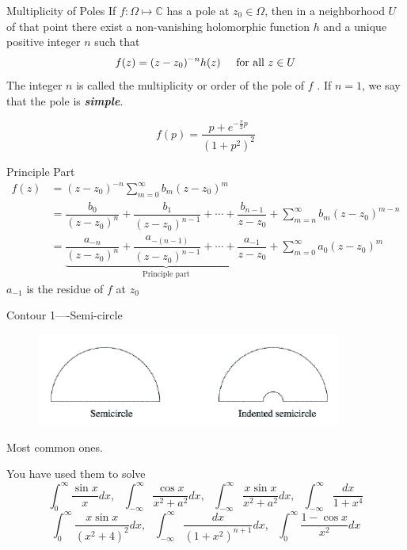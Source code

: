 \documentclass{beamer}
\begin{document}
\begin{frame}
\begin{block}{Multiplicity of Poles}
If $f : \Omega\mapsto\mathbb{C}$ has a pole at $z_0\in\Omega$, then in a neighborhood $U$ of that point there exist a non-vanishing holomorphic function $h$ and a unique positive integer $n$ such that
$$f(z)=(z-z_0)^{-n}h(z)\hspace{5mm}\text{for all}\,\, z\in U$$
The integer $n$ is called the multiplicity
or order of the pole of $f$ . If $n = 1$, we say that the pole is \textcolor[rgb]{0,0.6,0.3}{\textbf{\textit{simple}}}.
\end{block}
\begin{block}{}
$$f(p)=\dfrac{p+e^{-\frac{\pi}{2}p}}{(1+p^2)^2}$$

\end{block}

\end{frame}
\begin{frame}
\begin{block}{Principle Part}
\begin{align*}
f(z)&=(z-z_0)^{-n}\sum\limits_{m=0}^{\infty}b_m(z-z_0)^m\\
&=\dfrac{b_0}{(z-z_0)^n}+\dfrac{b_1}{(z-z_0)^{n-1}}+\cdots+\dfrac{b_{n-1}}{z-z_0}+\sum\limits_{m=n}^{\infty}b_m(z-z_0)^{m-n}\\
&=\underbrace{\dfrac{a_{-n}}{(z-z_0)^n}+\dfrac{a_{-(n-1)}}{(z-z_0)^{n-1}}+\cdots+\dfrac{a_{-1}}{z-z_0}}_{\text{Principle part}}+\sum\limits_{m=0}^{\infty}a_0(z-z_0)^m
\end{align*}
$a_{-1} $ is the residue of $f$ at $z_0$
\end{block}
\end{frame}

\begin{frame}
\begin{block}{Contour 1----Semi-circle}
\begin{figure}[h]
    \centering
    \includegraphics[width=10cm]{semicircle.png}
\end{figure}
Most common ones.

You have used them to solve 
$$\int_0^{\infty}\dfrac{\sin x}{x}dx,\,\,\,\,\int_{-\infty}^{\infty}\dfrac{\cos x}{x^2+a^2}dx,\,\,\,\,\int_{-\infty}^{\infty}\dfrac{x\sin x}{x^2+a^2}dx,\,\,\,\,\int_{-\infty}^{\infty}\dfrac{dx}{1+x^4}$$
$$\int_0^{\infty}\dfrac{x\sin x}{(x^2+4)^2}dx,\,\,\,\,\int_{-\infty}^{\infty}\dfrac{dx}{(1+x^2)^{n+1}}dx,\,\,\,\,\int_{0}^{\infty}\dfrac{1-\cos x}{x^2}dx$$
\end{block}
\end{frame}
\end{document}
